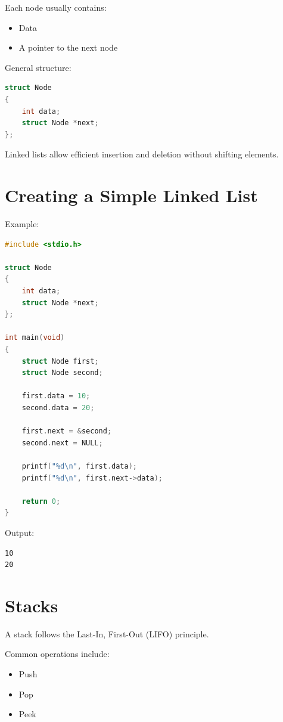 \documentclass[12pt,openany]{book}
\begin{document}
Each node usually contains:

\begin{itemize}
    \item Data
    \item A pointer to the next node
\end{itemize}

General structure:

\begin{lstlisting}[language=C]
struct Node
{
    int data;
    struct Node *next;
};
\end{lstlisting}

Linked lists allow efficient insertion and deletion without shifting elements.

\section{Creating a Simple Linked List}

Example:

\begin{lstlisting}[language=C]
#include <stdio.h>

struct Node
{
    int data;
    struct Node *next;
};

int main(void)
{
    struct Node first;
    struct Node second;

    first.data = 10;
    second.data = 20;

    first.next = &second;
    second.next = NULL;

    printf("%d\n", first.data);
    printf("%d\n", first.next->data);

    return 0;
}
\end{lstlisting}

Output:

\begin{lstlisting}
10
20
\end{lstlisting}
\section{Stacks}

A stack follows the Last-In, First-Out (LIFO) principle.

Common operations include:

\begin{itemize}
    \item Push
    \item Pop
    \item Peek
\end{itemize}
\end{document}
